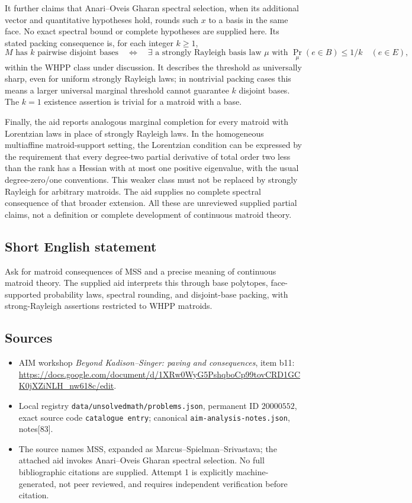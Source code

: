 \documentclass[11pt]{article}
\begin{document}
It further claims that Anari--Oveis Gharan spectral selection, when its additional vector and quantitative hypotheses hold, rounds such \(x\) to a basis in the same face. No exact spectral bound or complete hypotheses are supplied here. Its stated packing consequence is, for each integer \(k\geq1\),
\[
M\text{ has }k\text{ pairwise disjoint bases}
\quad\Longleftrightarrow\quad
\exists\text{ a strongly Rayleigh basis law }\mu
\text{ with }\Pr_\mu(e\in B)\leq1/k\quad(e\in E),
\]
within the WHPP class under discussion. It describes the threshold as universally sharp, even for uniform strongly Rayleigh laws; in nontrivial packing cases this means a larger universal marginal threshold cannot guarantee \(k\) disjoint bases. The \(k=1\) existence assertion is trivial for a matroid with a base.

Finally, the aid reports analogous marginal completion for every matroid with Lorentzian laws in place of strongly Rayleigh laws. In the homogeneous multiaffine matroid-support setting, the Lorentzian condition can be expressed by the requirement that every degree-two partial derivative of total order two less than the rank has a Hessian with at most one positive eigenvalue, with the usual degree-zero/one conventions. This weaker class must not be replaced by strongly Rayleigh for arbitrary matroids. The aid supplies no complete spectral consequence of that broader extension. All these are unreviewed supplied partial claims, not a definition or complete development of continuous matroid theory.
\subsection{Short English statement}
Ask for matroid consequences of MSS and a precise meaning of continuous matroid theory. The supplied aid interprets this through base polytopes, face-supported probability laws, spectral rounding, and disjoint-base packing, with strong-Rayleigh assertions restricted to WHPP matroids.
\subsection{Sources}
\begin{itemize}
\item AIM workshop \emph{Beyond Kadison--Singer: paving and consequences}, item b11: \url{https://docs.google.com/document/d/1XRw0WyG5PshqboCp99tovCRD1GCK0jXZiNLH_nw618c/edit}.
\item Local registry \texttt{data/unsolvedmath/problems.json}, permanent ID \(20000552\), exact source code \texttt{catalogue entry}; canonical \texttt{aim-analysis-notes.json}, notes[83].
\item The source names MSS, expanded as Marcus--Spielman--Srivastava; the attached aid invokes Anari--Oveis Gharan spectral selection. No full bibliographic citations are supplied. Attempt 1 is explicitly machine-generated, not peer reviewed, and requires independent verification before citation.
\end{itemize}
\end{document}
